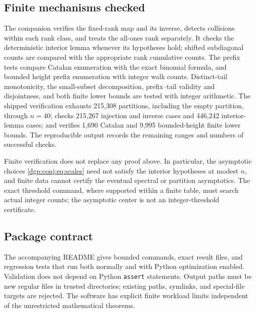 \documentclass[11pt,letterpaper]{article}
\numberwithin{equation}{section}
\theoremstyle{remark}\newtheorem{remark}[theorem]{Remark}
\begin{document}
\subsection{Finite mechanisms checked}
The companion verifies the fixed-rank map and its inverse, detects
collisions within each rank class, and treats the all-ones rank
separately. It checks the deterministic interior lemma whenever its
hypotheses hold; shifted subdiagonal counts are compared with the
appropriate rank cumulative counts. The prefix tests compare
Catalan enumeration with the exact binomial formula, and bounded
height prefix enumeration with integer walk counts. Distinct-tail
monotonicity, the small-subset decomposition, prefix--tail validity
and disjointness, and both finite lower bounds are tested with
integer arithmetic. The shipped verification exhausts 215,308 partitions, including the
empty partition, through $n=40$; checks 215,267 injection and inverse
cases and 446,242 interior-lemma cases; and verifies 1,690 Catalan and
9,995 bounded-height finite lower bounds. The reproducible output
records the remaining ranges and numbers of successful checks.

Finite verification does not replace any proof above. In
particular, the asymptotic choices \eqref{dgp:conj:eq:scales} need not satisfy
the interior hypotheses at modest $n$, and finite data cannot
certify the eventual spectral or partition asymptotics. The exact
threshold command, where supported within a finite table, must
search actual integer counts; the asymptotic center is not an
integer-threshold certificate.

\subsection{Package contract}
The accompanying README gives bounded commands, exact result
files, and regression tests that run both normally and with Python
optimization enabled. Validation does not depend on Python
\texttt{assert} statements. Output paths must be new regular files
in trusted directories; existing paths, symlinks, and special-file
targets are rejected. The software has explicit finite workload
limits independent of the unrestricted mathematical theorems.
\end{document}
